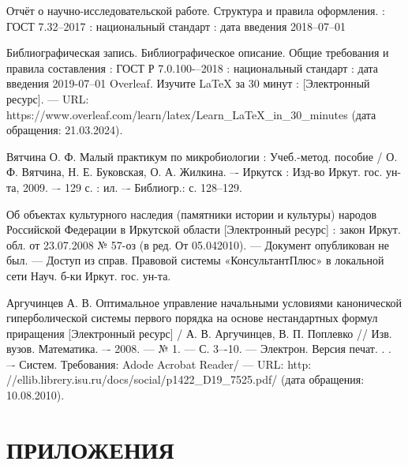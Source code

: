 \documentclass{report}
\begin{document}
\begin{thebibliography}{}

    Отчёт о научно-исследовательской работе. Структура и правила оформления. : ГОСТ 7.32--2017 : национальный стандарт : дата введения 2018–07–01
    
    Библиографическая запись. Библиографическое описание. Общие требования и правила составления : ГОСТ Р 7.0.100-–2018 : национальный стандарт : дата введения 2019-07–01
    Overleaf. Изучите LaTeX за 30 минут : [Электронный ресурс]. --– URL: https://www.overleaf.com/learn/latex/Learn\_LaTeX\_in\_30\_minutes \break(дата обращения: 21.03.2024).

    Вятчина О. Ф. Малый практикум по микробиологии : Учеб.-метод. пособие / О. Ф. Вятчина, Н. Е. Буковская, О. А. Жилкина. –- Иркутск : Изд-во Иркут. гос. ун-та, 2009. –- 129 с. : ил. –- Библиогр.: с. 128–129.

    Об объектах культурного наследия (памятники истории и культуры) народов Российской Федерации в Иркутской области [Электронный ресурс]  : закон Иркут. обл. от 23.07.2008 № 57-оз (в ред. От 05.042010). --– Документ опубликован не был. --– Доступ из справ. Правовой системы «КонсультантПлюс» в локальной сети Науч. б-ки Иркут. гос. ун-та.
    
    Аргучинцев А. В. Оптимальное управление начальными условиями канонической гиперболической системы первого порядка на основе нестандартных формул приращения [Электронный ресурс] / А. В. Аргучинцев, В. П. Поплевко // Изв. вузов. Математика. –- 2008. --– № 1. --– С. 3–-10. --– Электрон. Версия печат. . . –- Систем. Требования: Adode Acrobat Reader/ --- URL: http: //ellib.librery.isu.ru/docs/social/p1422\_D19\_7525.pdf/ (дата обращения: 10.08.2010).

\end{thebibliography}


\chapter*{ПРИЛОЖЕНИЯ}

\end{document}
